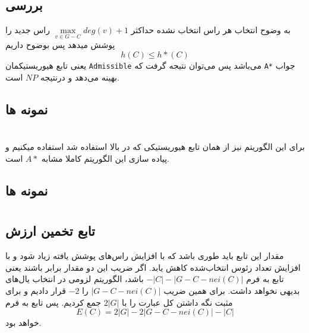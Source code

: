 \subsection{بررسی }
به وضوح انتخاب هر راس انتخاب نشده حداکثر
$\max\limits_{v \in {G - C}} {deg(v) + 1}$
راس جدید را پوشش میدهد پس بوضوح داریم 
\begin{equation}
\label{e01}
h(C) \leq h*(C)
\end{equation}
یعنی تابع هیوریستیکمان 
\verb;Admissible;
می‌باشد پس می‌توان نتیجه گرفت که 
\verb;A*;
جواب بهینه می‌دهد و درنتیجه 
‌‌$NP$
است.

\subsection{نمونه ها}



\section{}
برای این الگوریتم نیز از همان تابع هیوریستیکی که در بالا استفاده شد استفاده میکنیم و پیاده سازی این الگوریتم کاملا مشابه 
$A*$
است.

\subsection{نمونه ها}




\section{}
\subsection{تابع تخمین ارزش}
مقدار این تابع باید طوری باشد که با افزایش راس‌های پوشش یافته زیاد شود و با افزایش تعداد رئوس انتخاب‌شده کاهش یابد.
اگر ضریب این دو مقدار برابر باشند یعنی تابع به فرم
$-|C| -|G - C - nei(C)| $
باشد، الگوریتم لزومی در انتخاب یال‌های بدیهی نخواهد داشت.
برای همین ضریب 
$|G - C - nei(C)|$
را 
$-2$
قرار دادیم و برای مثبت نگه داشتن کل عبارت را با
$2|G|$
جمع کردیم.
پس تابع به فرم
\begin{equation}
\label{e01}
E(C) = 2 |G| - 2 |G - C - nei(C)| - |C|
\end{equation}
خواهد بود.
